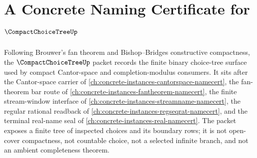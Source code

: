 \chapter{A Concrete Naming Certificate for $\CompactChoiceTreeUp$}
\label{ch:concrete-instances-compact-choice-tree-namecert}

Following Brouwer's fan theorem and Bishop--Bridges constructive compactness, the $\CompactChoiceTreeUp$ packet records the finite binary choice-tree surface used by compact Cantor-space and completion-modulus consumers. It sits after the Cantor-space carrier of \autoref{ch:concrete-instances-cantorspace-namecert}, the fan-theorem bar route of \autoref{ch:concrete-instances-fantheorem-namecert}, the finite stream-window interface of \autoref{ch:concrete-instances-streamname-namecert}, the regular rational readback of \autoref{ch:concrete-instances-regseqrat-namecert}, and the terminal real-name seal of \autoref{ch:concrete-instances-real-namecert}. The packet exposes a finite tree of inspected choices and its boundary rows; it is not open-cover compactness, not countable choice, not a selected infinite branch, and not an ambient completeness theorem.

